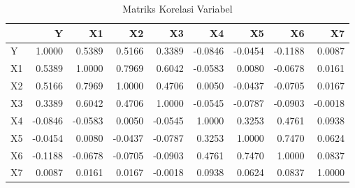 \begin{table}[H]
\centering
\caption{Matriks Korelasi Variabel}
\label{tab:korelasi}
\footnotesize
\begin{tabular}{lrrrrrrrr}
\toprule
 & Y & X1 & X2 & X3 & X4 & X5 & X6 & X7 \\
\midrule
Y & 1.0000 & 0.5389 & 0.5166 & 0.3389 & -0.0846 & -0.0454 & -0.1188 & 0.0087 \\
X1 & 0.5389 & 1.0000 & 0.7969 & 0.6042 & -0.0583 & 0.0080 & -0.0678 & 0.0161 \\
X2 & 0.5166 & 0.7969 & 1.0000 & 0.4706 & 0.0050 & -0.0437 & -0.0705 & 0.0167 \\
X3 & 0.3389 & 0.6042 & 0.4706 & 1.0000 & -0.0545 & -0.0787 & -0.0903 & -0.0018 \\
X4 & -0.0846 & -0.0583 & 0.0050 & -0.0545 & 1.0000 & 0.3253 & 0.4761 & 0.0938 \\
X5 & -0.0454 & 0.0080 & -0.0437 & -0.0787 & 0.3253 & 1.0000 & 0.7470 & 0.0624 \\
X6 & -0.1188 & -0.0678 & -0.0705 & -0.0903 & 0.4761 & 0.7470 & 1.0000 & 0.0837 \\
X7 & 0.0087 & 0.0161 & 0.0167 & -0.0018 & 0.0938 & 0.0624 & 0.0837 & 1.0000 \\
\bottomrule
\end{tabular}
\end{table}

